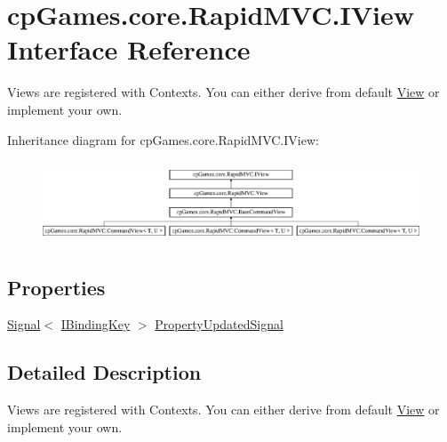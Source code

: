 \hypertarget{interfacecp_games_1_1core_1_1_rapid_m_v_c_1_1_i_view}{}\section{cp\+Games.\+core.\+Rapid\+M\+V\+C.\+I\+View Interface Reference}
\label{interfacecp_games_1_1core_1_1_rapid_m_v_c_1_1_i_view}


Views are registered with Contexts. You can either derive from default \mbox{\hyperlink{classcp_games_1_1core_1_1_rapid_m_v_c_1_1_view}{View}} or implement your own.  


Inheritance diagram for cp\+Games.\+core.\+Rapid\+M\+V\+C.\+I\+View\+:\begin{figure}[H]
\begin{center}
\leavevmode
\includegraphics[height=2.472406cm]{interfacecp_games_1_1core_1_1_rapid_m_v_c_1_1_i_view}
\end{center}
\end{figure}
\subsection*{Properties}
\begin{DoxyCompactItemize}
\item 
\mbox{\hyperlink{classcp_games_1_1core_1_1_rapid_m_v_c_1_1_signal}{Signal}}$<$ \mbox{\hyperlink{interfacecp_games_1_1core_1_1_rapid_m_v_c_1_1_i_binding_key}{I\+Binding\+Key}} $>$ \mbox{\hyperlink{interfacecp_games_1_1core_1_1_rapid_m_v_c_1_1_i_view_ae21e2d124f1e977c79babb40c3e991e8}{Property\+Updated\+Signal}}
\end{DoxyCompactItemize}


\subsection{Detailed Description}
Views are registered with Contexts. You can either derive from default \mbox{\hyperlink{classcp_games_1_1core_1_1_rapid_m_v_c_1_1_view}{View}} or implement your own. 



